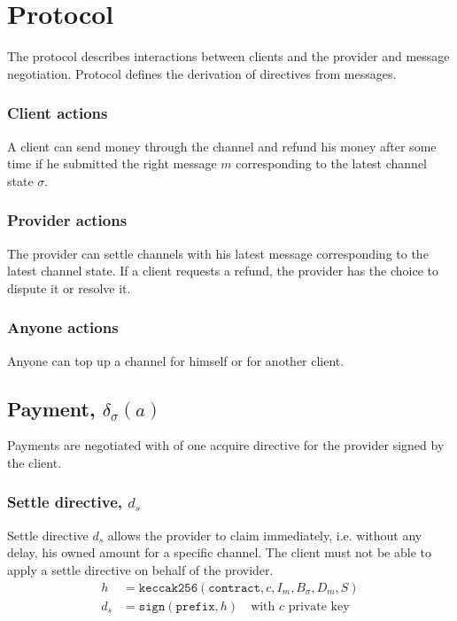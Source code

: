 \documentclass{llncs}
\begin{document}
\section{Protocol} The protocol describes interactions between clients and the provider and message negotiation. Protocol defines the derivation of directives from messages.

\subsubsection{Client actions} A client can send money through the channel and refund his money after some time if he submitted the right message $m$ corresponding to the latest channel state $\sigma$.

\subsubsection{Provider actions} The provider can settle channels with his latest message corresponding to the latest channel state. If a client requests a refund, the provider has the choice to dispute it or resolve it.

\subsubsection{Anyone actions} Anyone can top up a channel for himself or for another client.

\subsection{Payment, $\delta_\sigma(a)$} Payments are negotiated with of one acquire directive for the provider signed by the client.

\subsubsection{Settle directive, $d_s$} Settle directive $d_s$ allows the provider to claim immediately, i.e. without any delay, his owned amount for a specific channel. The client must not be able to apply a settle directive on behalf of the provider.
\begin{equation*}
\begin{split}
    h &= \texttt{keccak256}(\texttt{contract},c,I_m,B_\sigma,D_m,S) \\
    d_s &= \texttt{sign}(\texttt{prefix}, h) \quad \text{with $c$ private key} \\
\end{split}
\end{equation*}
\end{document}
